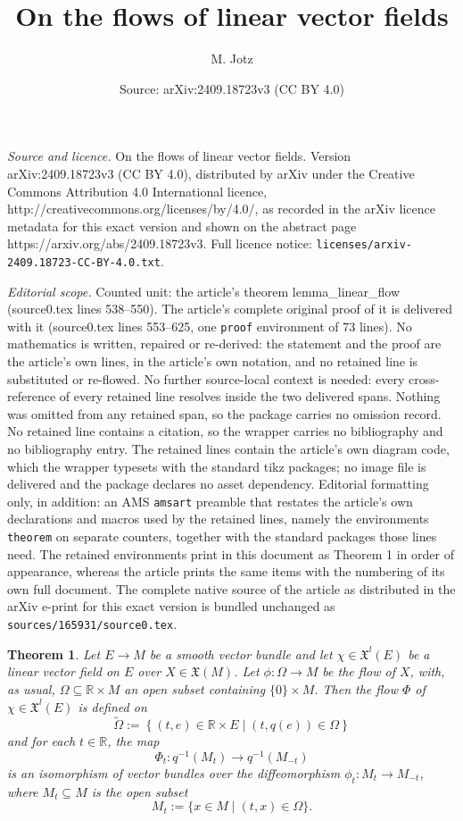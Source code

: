 \documentclass[10pt,a4paper]{amsart}
\title{On the flows of linear vector fields}
\author{M. Jotz}
\date{Source: arXiv:2409.18723v3 (CC BY 4.0)}
\newtheorem{theorem}{Theorem}
\newcommand{\R}{\mathbb{R}}
\newcommand{\inv}{^{-1}}
\newcommand{\mx}{\mathfrak{X}}
\begin{document}
\maketitle

\noindent\emph{Source and licence.} On the flows of linear vector fields. Version arXiv:2409.18723v3 (CC BY 4.0), distributed by arXiv under the Creative Commons Attribution 4.0 International licence, http://creativecommons.org/licenses/by/4.0/, as recorded in the arXiv licence metadata for this exact version and shown on the abstract page https://arxiv.org/abs/2409.18723v3. Full licence notice: \texttt{licenses/arxiv-2409.18723-CC-BY-4.0.txt}.\par\smallskip

\noindent\textit{Editorial scope.} Counted unit: the article's theorem lemma\_linear\_flow (source0.tex lines 538--550). The article's complete original proof of it is delivered with it (source0.tex lines 553--625, one \texttt{proof} environment of 73 lines). No mathematics is written, repaired or re-derived: the statement and the proof are the article's own lines, in the article's own notation, and no retained line is substituted or re-flowed.  No further source-local context is needed: every cross-reference of every retained line resolves inside the two delivered spans.  Nothing was omitted from any retained span, so the package carries no omission record.  No retained line contains a citation, so the wrapper carries no bibliography and no bibliography entry.  The retained lines contain the article's own diagram code, which the wrapper typesets with the standard tikz packages; no image file is delivered and the package declares no asset dependency.  Editorial formatting only, in addition: an AMS \texttt{amsart} preamble that restates the article's own declarations and macros used by the retained lines, namely the environments \texttt{theorem} on separate counters, together with the standard packages those lines need.  The retained environments print in this document as Theorem 1 in order of appearance, whereas the article prints the same items with the numbering of its own full document.  The complete native source of the article as distributed in the arXiv e-print for this exact version is bundled unchanged as \texttt{sources/165931/source0.tex}.
\begin{theorem}\label{lemma_linear_flow}
Let $E\to M$ be a smooth vector bundle and let $\chi\in\mx^l(E)$ be a linear vector field on $E$ over $X\in\mx(M)$. Let $\phi\colon \Omega\to M$ be the flow of $X$, with, as usual, $\Omega\subseteq \R\times M$ an open subset containing $\{0\}\times M$. Then the flow $\Phi$ of $\chi\in\mx^l(E)$ is defined on 
\[ \widetilde\Omega:=\left\{ (t, e)\in \R\times E \mid (t,q(e))\in \Omega
\right\}
\]
and for each $t\in\R$, the map
\[ \Phi_t\colon q\inv(M_t)\to q\inv(M_{-t})
\]
is an isomorphism of vector bundles over the diffeomorphism $\phi_t\colon M_t\to M_{-t}$, where 
$M_t\subseteq M$ is the open subset
\[ M_t:=\{x\in M\mid (t,x)\in\Omega\}.
\]
\end{theorem}
\end{document}
